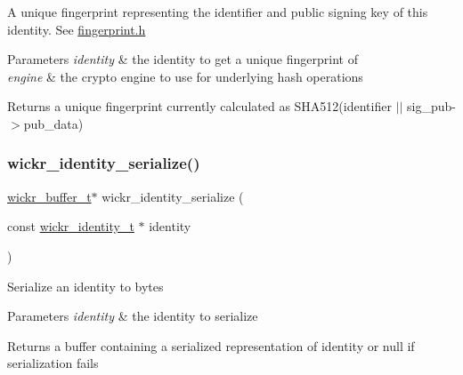 A unique fingerprint representing the identifier and public signing key of this identity. See \textquotesingle{}\mbox{\hyperlink{fingerprint_8h_source}{fingerprint.\+h}}\textquotesingle{}


\begin{DoxyParams}{Parameters}
{\em identity} & the identity to get a unique fingerprint of \\
\hline
{\em engine} & the crypto engine to use for underlying hash operations \\
\hline
\end{DoxyParams}
\begin{DoxyReturn}{Returns}
a unique fingerprint currently calculated as S\+H\+A512(identifier $\vert$$\vert$ sig\+\_\+pub-\/$>$pub\+\_\+data) 
\end{DoxyReturn}
\mbox{\label{group__wickr__identity_ga79ca0713d0b90873e584379f26cbd051}} 
\subsubsection{\texorpdfstring{wickr\+\_\+identity\+\_\+serialize()}{wickr\_identity\_serialize()}}
{\footnotesize\ttfamily \mbox{\hyperlink{structwickr__buffer}{wickr\+\_\+buffer\+\_\+t}}$\ast$ wickr\+\_\+identity\+\_\+serialize (\begin{DoxyParamCaption}\item[{const \mbox{\hyperlink{structwickr__identity}{wickr\+\_\+identity\+\_\+t}} $\ast$}]{identity }\end{DoxyParamCaption})}

Serialize an identity to bytes


\begin{DoxyParams}{Parameters}
{\em identity} & the identity to serialize \\
\hline
\end{DoxyParams}
\begin{DoxyReturn}{Returns}
a buffer containing a serialized representation of \textquotesingle{}identity\textquotesingle{} or null if serialization fails 
\end{DoxyReturn}
\mbox{\label{group__wickr__identity_ga32097764e57e70d85a2e1277146495c9}} 
